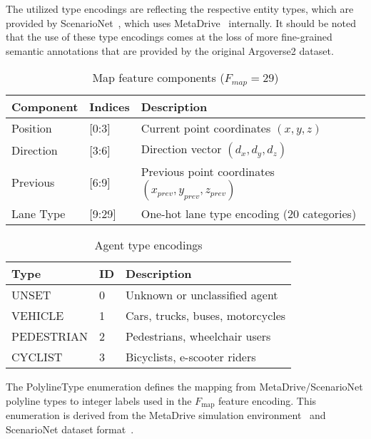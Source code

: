 The utilized type encodings are reflecting the respective entity types, which are provided by ScenarioNet~\cite{scenarionetFeng2024}, which uses MetaDrive~\cite{metadriveLi2022} internally. It should be noted that the use of these type encodings comes at the loss of more fine-grained semantic annotations that are provided by the original Argoverse2 dataset.

\begin{table}[H]
\caption{Map feature components ($F_{map} = 29$)}
\centering
\begin{tabular}{p{3cm}p{3cm}p{7cm}}
\toprule
\textbf{Component} & \textbf{Indices} & \textbf{Description} \\
\midrule
Position & [0:3] & Current point coordinates \((x, y, z)\) \\
Direction & [3:6] & Direction vector \((d_x, d_y, d_z)\) \\
Previous & [6:9] & Previous point coordinates \((x_{prev}, y_{prev}, z_{prev})\) \\
Lane Type & [9:29] & One-hot lane type encoding (20 categories) \\
\bottomrule
\end{tabular}
\end{table}


\begin{table}[H]
    \caption{Agent type encodings}
    \label{tab:agent_types}
\centering
\begin{tabular}{p{3cm}p{2cm}p{8cm}}
\toprule
\textbf{Type} & \textbf{ID} & \textbf{Description} \\
\midrule
UNSET & 0 & Unknown or unclassified agent \\
VEHICLE & 1 & Cars, trucks, buses, motorcycles \\
PEDESTRIAN & 2 & Pedestrians, wheelchair users \\
CYCLIST & 3 & Bicyclists, e-scooter riders \\
\bottomrule
\end{tabular}
\end{table}

The PolylineType enumeration defines the mapping from MetaDrive/ScenarioNet polyline types to integer labels used in the \(F_{\text{map}}\) feature encoding. This enumeration is derived from the MetaDrive simulation environment~\cite{metadriveLi2022} and ScenarioNet dataset format~\cite{scenarionetLi2023}.

